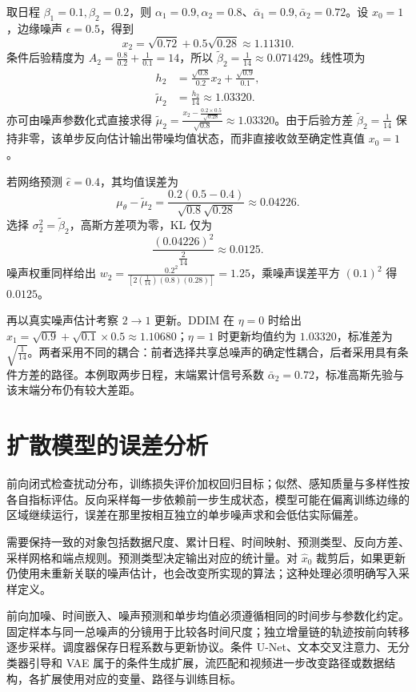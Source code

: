 \documentclass[../textbook.tex]{subfiles}
\begin{document}
\begin{example}

取日程 $\beta_1=0.1,\beta_2=0.2$，则 $\alpha_1=0.9,\alpha_2=0.8$、$\bar\alpha_1=0.9,\bar\alpha_2=0.72$。设 $x_0=1$，边缘噪声 $\epsilon=0.5$，得到
\begin{equation*}
 x_2=\sqrt{0.72}+0.5\sqrt{0.28}\approx1.11310.
\end{equation*}
条件后验精度为 $A_2=\frac{0.8}{0.2}+\frac{1}{0.1}=14$，所以 $\widetilde\beta_2=\frac{1}{14}\approx0.071429$。线性项为
\begin{align*}
 h_2&=\frac{\sqrt{0.8}}{0.2}x_2+\frac{\sqrt{0.9}}{0.1},\\
 \widetilde\mu_2&=\frac{h_2}{14}\approx1.03320.
\end{align*}
亦可由噪声参数化式直接求得 $\widetilde\mu_2=\frac{x_2-\frac{0.2\times0.5}{\sqrt{0.28}}}{\sqrt{0.8}}\approx1.03320$。由于后验方差 $\widetilde\beta_2=\frac{1}{14}$ 保持非零，该单步反向估计输出带噪均值状态，而非直接收敛至确定性真值 $x_0=1$。

若网络预测 $\widehat\epsilon=0.4$，其均值误差为
\begin{equation*}
 \mu_\theta-\widetilde\mu_2=\frac{0.2(0.5-0.4)}{\sqrt{0.8}\sqrt{0.28}}\approx0.04226.
\end{equation*}
选择 $\sigma_2^2=\widetilde\beta_2$，高斯方差项为零，KL 仅为
\begin{equation*}
 \frac{(0.04226)^2}{\frac{2}{14}}\approx0.0125.
\end{equation*}
噪声权重同样给出 $w_2=\frac{0.2^2}{[2(\frac{1}{14})(0.8)(0.28)]}=1.25$，乘噪声误差平方 $(0.1)^2$ 得 $0.0125$。

再以真实噪声估计考察 $2\to1$ 更新。DDIM 在 $\eta=0$ 时给出 $x_1=\sqrt{0.9}+\sqrt{0.1}\times0.5\approx1.10680$；$\eta=1$ 时更新均值约为 $1.03320$，标准差为 $\sqrt{\frac{1}{14}}$。两者采用不同的耦合：前者选择共享总噪声的确定性耦合，后者采用具有条件方差的路径。本例取两步日程，末端累计信号系数 $\bar\alpha_2=0.72$，标准高斯先验与该末端分布仍有较大差距。
\end{example}

\section{扩散模型的误差分析}

前向闭式检查扰动分布，训练损失评价加权回归目标；似然、感知质量与多样性按各自指标评估。反向采样每一步依赖前一步生成状态，模型可能在偏离训练边缘的区域继续运行，误差在那里按相互独立的单步噪声求和会低估实际偏差。

需要保持一致的对象包括数据尺度、累计日程、时间映射、预测类型、反向方差、采样网格和端点规则。预测类型决定输出对应的统计量。对 $\widehat x_0$ 裁剪后，如果更新仍使用未重新关联的噪声估计，也会改变所实现的算法；这种处理必须明确写入采样定义。

前向加噪、时间嵌入、噪声预测和单步均值必须遵循相同的时间步与参数化约定。固定样本与同一总噪声的分镜用于比较各时间尺度；独立增量链的轨迹按前向转移逐步采样。调度器保存日程系数与更新协议。条件 U-Net、文本交叉注意力、无分类器引导和 VAE 属于的条件生成扩展，流匹配和视频进一步改变路径或数据结构，各扩展使用对应的变量、路径与训练目标。

\chapterreferences
\myendchapterdocument
\end{document}
